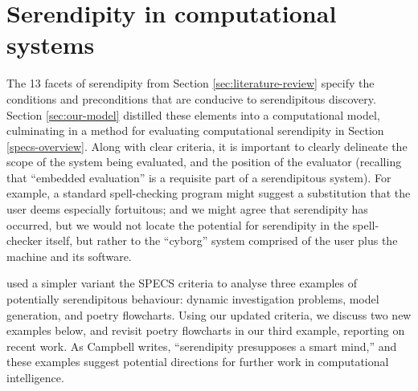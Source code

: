\section{Serendipity in computational systems} \label{sec:computational-serendipity}

The 13 facets of serendipity from Section \ref{sec:literature-review}
specify the conditions and preconditions that are conducive to
serendipitous discovery.  Section \ref{sec:our-model} distilled these
elements into a computational model, culminating in a method for
evaluating computational serendipity in Section \ref{specs-overview}.
%
Along with clear criteria, it is important to clearly delineate the
scope of the system being evaluated, and the position of the evaluator
(recalling that ``embedded evaluation'' is a requisite part of a
serendipitous system).  For example, a standard spell-checking program
might suggest a substitution that the user deems especially
fortuitous; and we might agree that serendipity has occurred, but we
would not locate the potential for serendipity in the spell-checker
itself, but rather to the ``cyborg'' system comprised of the user plus
the machine and its software.

 used a simpler variant the SPECS criteria
to analyse three examples of potentially serendipitous behaviour:
dynamic investigation problems, model generation, and poetry
flowcharts.  Using our updated criteria, we discuss two new examples
below, and revisit poetry flowcharts in our third example, reporting
on recent work.  As Campbell \citeyear{campbell2005serendipity}
writes, ``serendipity presupposes a smart mind,'' and these examples
suggest potential directions for further work in computational
intelligence.


